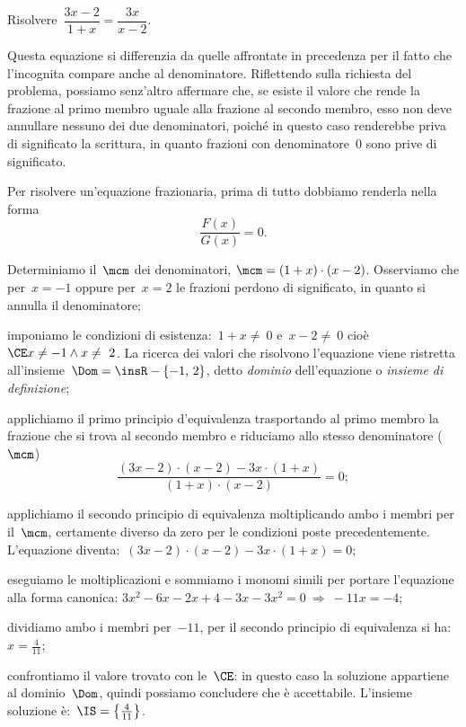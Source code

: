 \begin{exrig}
 \begin{esempio}
Risolvere~$\dfrac{3x-2}{1+x}=\dfrac{3x}{x-2}$.
 \end{esempio}
Questa equazione si differenzia da quelle affrontate in precedenza per il fatto che l'incognita compare anche al denominatore.
Riflettendo sulla richiesta del problema, possiamo senz'altro affermare che, se esiste il valore che rende
la frazione al primo membro uguale alla frazione al secondo membro, esso non deve annullare nessuno dei due denominatori,
poiché in questo caso renderebbe priva di significato la scrittura, in quanto frazioni con denominatore~$0$ sono prive di significato.

Per risolvere un'equazione frazionaria, prima di tutto dobbiamo renderla nella forma
\begin{equation*}
\frac{F(x)}{G(x)}=0.
\end{equation*}

\begin{enumeratea}
 \item Determiniamo il~$\mcm$ dei denominatori, $\mcm=(1+x)\cdot (x-2)$.
    Osserviamo che per~$x = -1$ oppure per~$x = 2$ le frazioni perdono di significato, in quanto si annulla il denominatore;
 \item imponiamo le condizioni di esistenza:~$1+x\neq~0$ e~$x-2\neq~0$ cioè~$\CE x\neq -1\wedge x\neq~2$. La ricerca dei valori
    che risolvono l'equazione viene ristretta all'insieme~$\Dom=\insR-\{-1\text{,~}2\}$, detto \emph{dominio} dell'equazione o
    \emph{insieme di definizione};
 \item applichiamo il primo principio d'equivalenza trasportando al primo membro la frazione che si trova al secondo membro
    e riduciamo allo stesso denominatore ($\mcm$)
    \begin{equation*}
      \frac{(3x-2)\cdot (x-2)-3x\cdot (1+x)}{(1+x)\cdot (x-2)}=0;
    \end{equation*}
 \item applichiamo il secondo principio di equivalenza moltiplicando ambo i membri per il~$\mcm$,
    certamente diverso da zero per le condizioni poste precedentemente. L'equazione diventa:~$(3x-2)\cdot (x-2)-3x\cdot (1+x)=0$;
 \item eseguiamo le moltiplicazioni e sommiamo i monomi simili per portare l'equazione alla forma canonica:
    $3x^{2}-6x-2x+4-3x-3x^{2}=0\: \Rightarrow\: -11x=-4$;
 \item dividiamo ambo i membri per~$-11$, per il secondo principio di equivalenza si ha:~$x=\frac{4}{11}$;
 \item confrontiamo il valore trovato con le~$\CE$: in questo caso la soluzione appartiene al dominio~$\Dom$, quindi possiamo concludere
    che è accettabile. L'insieme soluzione è:~$\IS=\left\{\frac{4}{11}\right\}$.
\end{enumeratea}


\end{exrig}
